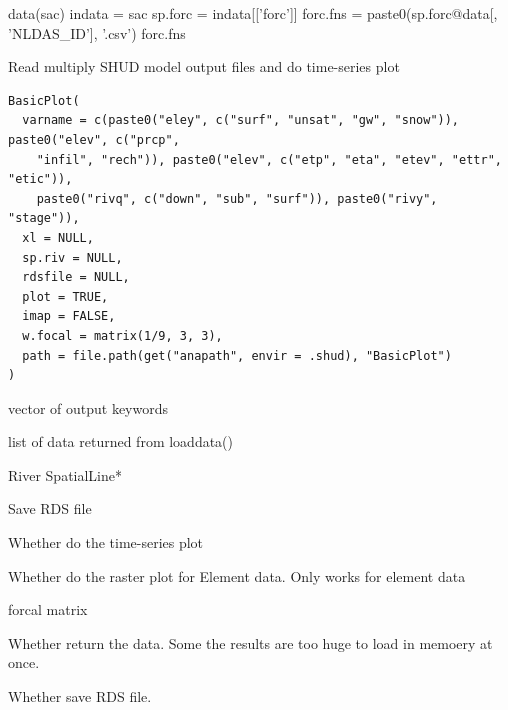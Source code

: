 \documentclass[a4paper]{book}
\begin{document}
%
\begin{Value}
\end{Value}
%
\begin{Examples}
\begin{ExampleCode}
data(sac)
indata = sac
sp.forc = indata[['forc']]
forc.fns = paste0(sp.forc@data[, 'NLDAS_ID'], '.csv')
forc.fns
\end{ExampleCode}
\end{Examples}
%
\begin{Description}\relax
Read multiply SHUD model output files and do time-series plot
\end{Description}
%
\begin{Usage}
\begin{verbatim}
BasicPlot(
  varname = c(paste0("eley", c("surf", "unsat", "gw", "snow")), paste0("elev", c("prcp",
    "infil", "rech")), paste0("elev", c("etp", "eta", "etev", "ettr", "etic")),
    paste0("rivq", c("down", "sub", "surf")), paste0("rivy", "stage")),
  xl = NULL,
  sp.riv = NULL,
  rdsfile = NULL,
  plot = TRUE,
  imap = FALSE,
  w.focal = matrix(1/9, 3, 3),
  path = file.path(get("anapath", envir = .shud), "BasicPlot")
)
\end{verbatim}
\end{Usage}
%
\begin{Arguments}
\begin{ldescription}
\item[\code{varname}] vector of output keywords

\item[\code{xl}] list of data returned from loaddata()

\item[\code{sp.riv}] River SpatialLine*

\item[\code{rdsfile}] Save RDS file

\item[\code{plot}] Whether do the time-series plot

\item[\code{imap}] Whether do the raster plot for Element data. Only works for element data

\item[\code{w.focal}] forcal matrix

\item[\code{return}] Whether return the data. Some the results are too huge to load in memoery at once.

\item[\code{iRDS}] Whether save RDS file.
\end{ldescription}
\end{Arguments}
\end{document}
